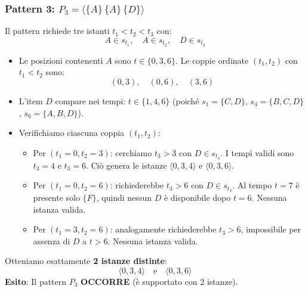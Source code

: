 \subsubsection{Pattern 3: $P_3 = \langle \{A\} \, \{A\} \, \{D\} \rangle$}
Il pattern richiede tre istanti $t_1 < t_2 < t_3$ con:
\begin{equation*}
A \in s_{t_1}, \quad A \in s_{t_2}, \quad D \in s_{t_3}
\end{equation*}
\begin{itemize}
    \item Le posizioni contenenti $A$ sono $t \in \{0, 3, 6\}$. Le coppie ordinate $(t_1, t_2)$ con $t_1 < t_2$ sono:
    \begin{equation*}
    (0, 3), \quad (0, 6), \quad (3, 6)
    \end{equation*}
    \item L'item $D$ compare nei tempi: $t \in \{1, 4, 6\}$ (poiché $s_1 = \{C, D\}$, $s_4 = \{B, C, D\}$, $s_6 = \{A, B, D\}$).
    \item Verifichiamo ciascuna coppia $(t_1, t_2)$:
    \begin{itemize}
        \item Per $(t_1 = 0, t_2 = 3)$: cerchiamo $t_3 > 3$ con $D \in s_{t_3}$. I tempi validi sono $t_3 = 4$ e $t_3 = 6$.
        Ciò genera le istanze $\langle 0, 3, 4 \rangle$ e $\langle 0, 3, 6 \rangle$.
        \item Per $(t_1 = 0, t_2 = 6)$: richiederebbe $t_3 > 6$ con $D \in s_{t_3}$. Al tempo $t = 7$ è presente solo $\{F\}$, quindi nessun $D$ è disponibile dopo $t = 6$. Nessuna istanza valida.
        \item Per $(t_1 = 3, t_2 = 6)$: analogamente richiederebbe $t_3 > 6$, impossibile per assenza di $D$ a $t > 6$. Nessuna istanza valida.
    \end{itemize}
\end{itemize}
Otteniamo esattamente \textbf{2 istanze distinte}:
\begin{equation}
\langle 0, 3, 4 \rangle \quad \text{e} \quad \langle 0, 3, 6 \rangle
\end{equation}
\textbf{Esito}: Il pattern $P_3$ \textbf{OCCORRE} (è supportato con 2 istanze).

